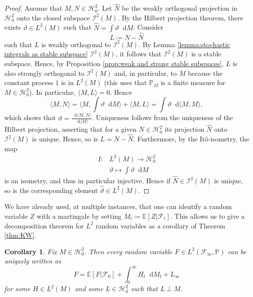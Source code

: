 \documentclass[11pt,a4paper,twoside,openany]{report}
\numberwithin{equation}{section}
\newcommand{\diff}{\mathop{}\!\mathrm{d}}
\theoremstyle{plain} %
\newtheorem{corollary}[theorem]{Corollary}
\theoremstyle{definition} %
\theoremstyle{remark} %
\begin{document}
\begin{proof}
    Assume that \(M,N\in\mathcal{H}_0^2\). Let \(\hat{N}\) be the weakly orthogonal projection in \(\mathcal{H}_0^2\) onto the closed subspace \(\mathcal{I}^2(M)\). By the Hilbert projection theorem, there exists \(\vartheta\in L^2(M)\) such that \(\hat{N}=\int \vartheta\diff M\). Consider
    \begin{equation*}
        L\coloneqq N-\hat{N}
    \end{equation*}
    such that \(L\) is weakly orthogonal to \(\mathcal{I}^2(M)\). By Lemma \ref{lemma:stochastic integrals as stable subspace} \(\mathcal{I}^2(M)\), it follows that \(\mathcal{I}^2(M)\) is a stable subspace. Hence, by Proposition \ref{prop:weak and strong stable subspaces}, \(L\) is also strongly orthogonal to \(\mathcal{I}^2(M)\) and, in particular, to \(M\) because the constant process \(1\) is in \(L^2(M)\) (this uses that \(\mathbb{P}_M\) is a finite measure for \(M\in\mathcal{H}_0^2\)). In particular, \(\langle M,L\rangle=0\). Hence 
    \begin{equation*}
        \langle M,N\rangle =\langle M,\int \vartheta\diff M\rangle+\langle M,L\rangle =\int \vartheta\diff \langle M,M\rangle,
    \end{equation*}
    which shows that \(\vartheta=\frac{\diff \langle M,N\rangle}{\diff \langle M\rangle}\). Uniqueness follows from the uniqueness of the Hilbert projection, asserting that for a given \(N\in\mathcal{H}^2_0\) its projection \(\hat{N}\) onto \(\mathcal{I}^2(M)\) is unique. Hence, so is \(L=N-\hat{N}\). Furthermore, by the Itô-isometry, the map
    \begin{align*}
        I:&L^2(M)\to\mathcal{H}^2_0
        \\&\vartheta\mapsto \int \vartheta\diff M
    \end{align*}
    is an isometry, and thus in particular injective. Hence if \(\hat{N}\in \mathcal{I}^2(M)\) is unique, so is the corresponding element \(\hat{\vartheta}\in L^2(M)\).
\end{proof}
We have already used, at multiple instances, that one can identify a random variable \(Z\) with a martingale by setting \(M_t\coloneqq\mathbb{E}[Z|\mathcal{F}_t]\). This allows us to give a decomposition theorem for \(L^2\) random variables as a corollary of Theorem \ref{thm:KW}. 
\begin{corollary}\label{cor:random variable level Kunita Watanabe}
    Fix \(M\in\mathcal{H}_{0}^2\). Then every random variable \(F\in L^2(\mathcal{F}_{\infty},\mathbb{P})\) can be uniquely written as 
    \begin{equation*}
        F = \mathbb{E}[F|\mathcal{F}_0]+\int_0^{\infty}H_t\diff M_t+L_{\infty}
    \end{equation*}
    for some \(H\in L^2(M)\) and some \(L\in \mathcal{H}_{0}^2\) such that \(L\perp M\).
\end{corollary}
\end{document}
